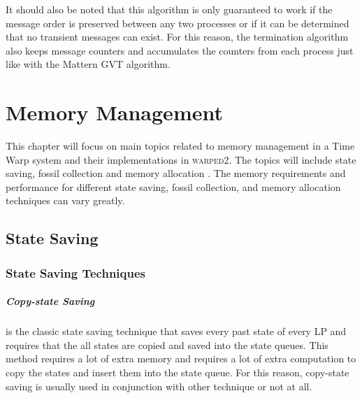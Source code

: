 \documentclass[11pt]{book}
\begin{document}
It should also be noted that this algorithm is only guaranteed to work if the message order is
preserved between any two processes or if it can be determined that no transient messages can exist.
For this reason, the termination algorithm also keeps message counters and accumulates the counters
from each process just like with the Mattern GVT algorithm.



\chapter{Memory Management}\label{memory_management}

This chapter will focus on main topics related to memory management in a Time Warp system and their
implementations in \textsc{warped2}.  The topics will include state saving, fossil collection and
memory allocation \cite{fujimoto-90,fujimoto-00}.  The memory requirements and performance for
different state saving, fossil collection, and memory allocation techniques can vary greatly.

\section{State Saving}

\subsection{State Saving Techniques}

\paragraph{Copy-state Saving} is the classic state saving technique that saves every past state of
every LP and requires that the all states are copied and saved into the state queues.  This method
requires a lot of extra memory and requires a lot of extra computation to copy the states and insert
them into the state queue.  For this reason, copy-state saving is usually used in conjunction with
other technique or not at all.
\end{document}
